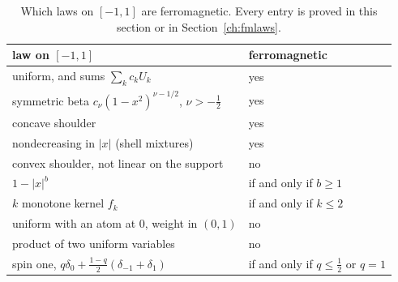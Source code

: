 \begin{table}[htbp]
\centering\small
\begin{tabular}{@{}ll@{}}
\toprule
law on $[-1,1]$ & ferromagnetic\\
\midrule
uniform, and sums $\sum_kc_kU_k$ & yes\\
symmetric beta $c_\nu(1-x^2)^{\nu-1/2}$, $\nu>-\frac12$ & yes\\
concave shoulder & yes\\
nondecreasing in $|x|$ (shell mixtures) & yes\\
convex shoulder, not linear on the support & no\\
$1-|x|^b$ & if and only if $b\ge1$\\
$k$ monotone kernel $f_k$ & if and only if $k\le2$\\
uniform with an atom at $0$, weight in $(0,1)$ & no\\
product of two uniform variables & no\\
spin one, $q\delta_0+\frac{1-q}2(\delta_{-1}+\delta_1)$ & if and only if $q\le\frac12$ or $q=1$\\
\bottomrule
\end{tabular}
\caption{Which laws on $[-1,1]$ are ferromagnetic. Every entry is proved in this section or in Section~\ref{ch:fmlaws}.}
\label{fm:tab:interval}
\end{table}
